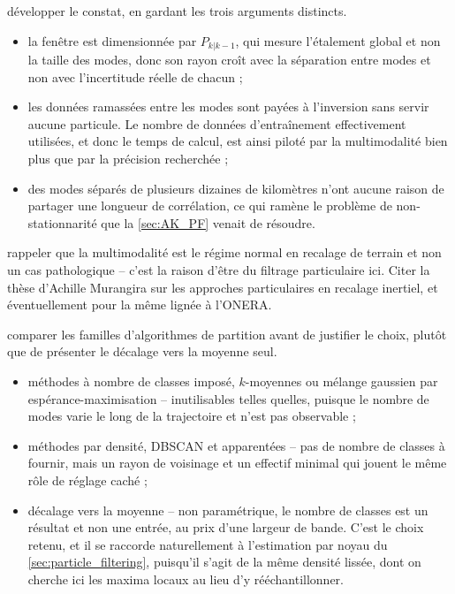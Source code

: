 {développer le constat, en gardant les trois arguments distincts.}
\begin{itemize}
	\item la fenêtre est dimensionnée par $P_{k|k-1}$, qui mesure l'étalement global et non la taille des modes, donc son rayon croît avec la séparation entre modes et non avec l'incertitude réelle de chacun ;
	\item les données ramassées entre les modes sont payées à l'inversion sans servir aucune particule. Le nombre de données d'entraînement effectivement utilisées, et donc le temps de calcul, est ainsi piloté par la multimodalité bien plus que par la précision recherchée ;
	\item des modes séparés de plusieurs dizaines de kilomètres n'ont aucune raison de partager une longueur de corrélation, ce qui ramène le problème de non-stationnarité que la \cref{sec:AK_PF} venait de résoudre.
\end{itemize}

{rappeler que la multimodalité est le régime normal en recalage de terrain et non un cas pathologique -- c'est la raison d'être du filtrage particulaire ici. Citer la thèse d'Achille Murangira \cite{bib:these-Murangira} sur les approches particulaires en recalage inertiel, et éventuellement \cite{bib:these-Dahia,bib:these-Palmier} pour la même lignée à l'ONERA.}

{comparer les familles d'algorithmes de partition avant de justifier le choix, plutôt que de présenter le décalage vers la moyenne seul.}
\begin{itemize}
	\item méthodes à nombre de classes imposé, $k$-moyennes ou mélange gaussien par espérance-maximisation -- inutilisables telles quelles, puisque le nombre de modes varie le long de la trajectoire et n'est pas observable ;
	\item méthodes par densité, DBSCAN et apparentées -- pas de nombre de classes à fournir, mais un rayon de voisinage et un effectif minimal qui jouent le même rôle de réglage caché ;
	\item décalage vers la moyenne \cite{bib:mean-shift,bib:mean-shift-clustering} -- non paramétrique, le nombre de classes est un résultat et non une entrée, au prix d'une largeur de bande. C'est le choix retenu, et il se raccorde naturellement à l'estimation par noyau du \cref{sec:particle_filtering}, puisqu'il s'agit de la même densité lissée, dont on cherche ici les maxima locaux au lieu d'y rééchantillonner.
\end{itemize}

